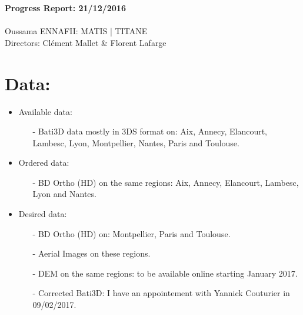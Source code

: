 \documentclass[a4paper, 11pt]{article}
\begin{document}
	\begin{centering}
		\large\textbf{Progress Report: 21/12/2016}\\
		~\\
		Oussama ENNAFII:
		\normalsize MATIS | TITANE \\
		Directors: Cl\'ement Mallet \& Florent Lafarge \\
	\end{centering}


	\section*{Data:}
	
	\begin{itemize}
		\item Available data:
			\begin{itemize}
				\item[-] Bati3D data mostly in 3DS format on: Aix, Annecy, Elancourt, Lambesc, Lyon, Montpellier, Nantes, Paris and Toulouse.
			\end{itemize}
		\item Ordered data:
			\begin{itemize}
				\item[-] BD Ortho (HD) on the same regions: Aix, Annecy, Elancourt, Lambesc, Lyon and Nantes.
			\end{itemize}
		\item Desired data:
			\begin{itemize}
				\item[-] BD Ortho (HD) on: Montpellier, Paris and Toulouse.
				\item[-] Aerial Images on these regions.
				\item[-] DEM on the same regions: to be available online starting January 2017.
				\item[-] Corrected Bati3D: I have an appointement with Yannick Couturier in 09/02/2017.
			\end{itemize}
	\end{itemize}
	
\end{document}

